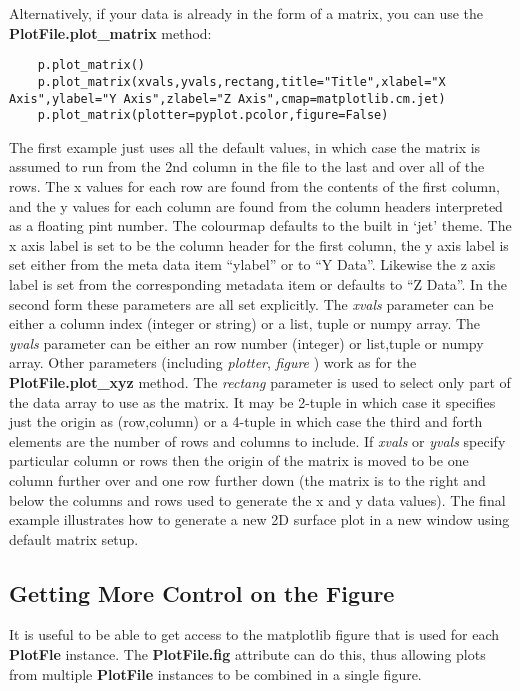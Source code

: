 \documentclass[a4paper,11pt]{scrartcl}
\begin{document}
 Alternatively, if your data is already in the form of a matrix, you can use the \textbf{PlotFile.plot\_matrix} method:

 \begin{lstlisting}
    p.plot_matrix()
    p.plot_matrix(xvals,yvals,rectang,title="Title",xlabel="X Axis",ylabel="Y Axis",zlabel="Z Axis",cmap=matplotlib.cm.jet)
    p.plot_matrix(plotter=pyplot.pcolor,figure=False)
 \end{lstlisting}

 The first example just uses all the default values, in which case the matrix is assumed to run from the 2nd column in the file to the last and over all of the rows. The x values for each row are found from the contents of the first column, and the y values for each column are found from the column headers interpreted as a floating pint number. The colourmap defaults to the built in `jet' theme. The x axis label is set to be the column header for the first column, the y axis label is set either from the meta data item ``ylabel'' or to ``Y Data''. Likewise the z axis label is set from the corresponding metadata item or defaults to ``Z Data''. In the second form these parameters are all set explicitly. The \textit{xvals} parameter can be either a column index (integer or string) or a list, tuple or numpy array. The \textit{yvals} parameter can be either an row number (integer) or list,tuple or numpy array. Other parameters (including \textit{plotter}, \textit{figure} \etc) work as for the \textbf{PlotFile.plot\_xyz} method. The \textit{rectang} parameter is used to select only part of the data array to use as the matrix. It may be 2-tuple in which case it specifies just the origin as (row,column) or a 4-tuple in which case the third and forth elements are the number of rows and columns to include. If \textit{xvals} or \textit{yvals} specify particular column or rows then the origin of the matrix is moved to be one column further over and one row further down (\ie the matrix is to the right and below the columns and rows used to generate the x and y data values). The final example illustrates how to generate a new 2D surface plot in a new window using default matrix setup.

 \subsection{Getting More Control on the Figure}

 It is useful to be able to get access to the matplotlib figure that is used for each \textbf{PlotFle} instance. The \textbf{PlotFile.fig} attribute can do this, thus allowing plots from multiple \textbf{PlotFile} instances to be combined in a single figure.
\end{document}
